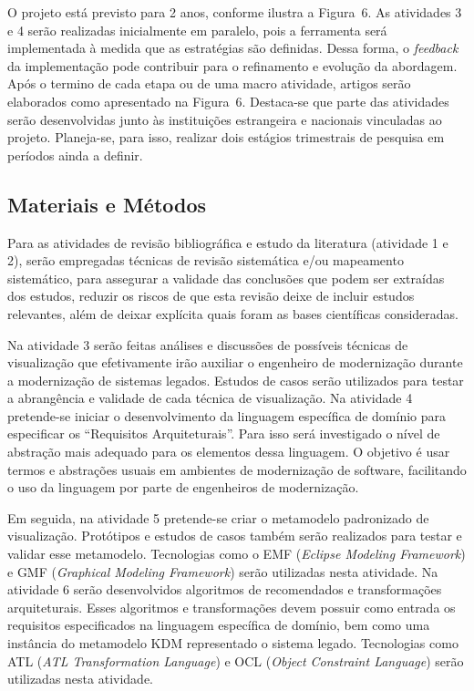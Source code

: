 \documentclass[12pt]{article}
\begin{document}
O projeto está previsto para 2 anos, conforme ilustra a Figura~6. As atividades 3 e 4 serão realizadas inicialmente em paralelo, pois a ferramenta será implementada à medida que as estratégias são definidas. Dessa forma, o \textit{feedback} da implementação pode contribuir para o refinamento e evolução da abordagem. Após o termino de cada etapa ou de uma macro atividade, artigos serão elaborados como apresentado na Figura~6. 
Destaca-se que parte das atividades serão desenvolvidas junto às instituições estrangeira e nacionais vinculadas ao projeto. Planeja-se, para isso, realizar dois estágios trimestrais de pesquisa em períodos ainda a definir. 

\subsection{Materiais e Métodos}

Para as atividades de revisão bibliográfica e estudo da literatura (atividade 1 e 2), serão empregadas técnicas de revisão sistemática e/ou mapeamento sistemático, para assegurar a validade das conclusões que podem ser extraídas dos estudos, reduzir os riscos de que esta revisão deixe de incluir estudos relevantes, além de deixar explícita quais foram as bases científicas consideradas.

Na atividade 3 serão feitas análises e discussões de possíveis técnicas de visualização que efetivamente irão auxiliar o engenheiro de modernização durante a modernização de sistemas legados. Estudos de casos serão utilizados para testar a abrangência e validade de cada técnica de visualização. Na atividade 4 pretende-se iniciar o desenvolvimento da linguagem específica de domínio para especificar os ``Requisitos Arquiteturais''. Para isso será investigado o nível de abstração mais adequado para os elementos dessa linguagem. O objetivo é usar termos e abstrações usuais em ambientes de modernização de software, facilitando o uso da linguagem por parte de engenheiros de modernização.

Em seguida, na atividade 5 pretende-se criar o metamodelo padronizado de visualização. Protótipos e estudos de casos também serão realizados para testar e validar esse metamodelo. Tecnologias como o EMF (\textit{Eclipse Modeling Framework}) e GMF (\textit{Graphical Modeling Framework}) serão utilizadas nesta atividade. Na atividade 6 serão desenvolvidos algoritmos de recomendados e transformações arquiteturais. Esses algoritmos e transformações devem possuir como entrada os requisitos especificados na linguagem específica de domínio, bem como uma instância do metamodelo KDM representado o sistema legado. Tecnologias como ATL (\textit{ATL Transformation Language}) e OCL (\textit{Object Constraint Language}) serão utilizadas nesta atividade. 
\end{document}
